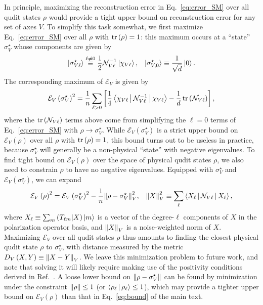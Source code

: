 \documentclass[a4paper,twocolumn,unpublished]{quantumarticle}
\newcommand{\f}[2]{\dfrac{#1}{#2}} %
\newcommand{\p}[1]{\left(#1\right)} %
\renewcommand{\sp}[1]{\left[#1\right]} %
\newcommand{\bk}{\Braket} %
\newcommand{\E}{\mathcal{E}}
\newcommand{\N}{\mathcal{N}}
\def\obk#1{\mathinner{({#1})}}
\begin{document}
In principle, maximizing the reconstruction error in Eq.~\eqref{eq:error_SM} over all qudit states $\rho$ would provide a tight upper bound on reconstruction error for any set of axes $V$.
To simplify this task somewhat, we first maximize Eq.~\eqref{eq:error_SM} over all $\rho$ with $\tr\p\rho=1$: this maximum occurs at a ``state'' $\sigma_V^\star$ whose components are given by
\begin{align}
  \ket{\sigma_{V\ell}^\star} \stackrel{\ell\ne0}{\equiv}
  \f12 \N_{V\ell}^{-1} \ket{\chi_{V\ell}},
  &&
  \ket{\sigma_{V,0}^\star} \equiv \f1{\sqrt{d}} \ket{0}.
\end{align}
The corresponding maximum of $\E_V$ is given by
\begin{align}
  \E_V\p{\sigma_V^\star}^2 = \f1n \sum_{\ell>0}
  \sp{\f14 \bk{\chi_{V\ell}|\N_{V\ell}^{-1}|\chi_{V\ell}}
  - \f1d \tr\p{\N_{V\ell}}},
\end{align}
where the $\tr\p{\N_{V\ell}}$ terms above come from simplifying the $\ell=0$ terms of Eq.~\eqref{eq:error_SM} with $\rho\to\sigma_V^\star$.
While $\E_V\p{\sigma_V^\star}$ is a strict upper bound on $\E_V\p{\rho}$ over all $\rho$ with $\tr\p{\rho}=1$, this bound turns out to be useless in practice, because $\sigma_V^\star$ will generally be a non-physical ``state'' with negative eigenvalues.
To find tight bound on $\E_V\p{\rho}$ over the space of physical qudit states $\rho$, we also need to constrain $\rho$ to have no negative eigenvalues.
Equipped with $\sigma_V^\star$ and $\E_V\p{\sigma_V^\star}$, we can expand
\begin{align}
  \E_V\p{\rho}^2 = \E_V\p{\sigma_V^\star}^2
  - \f1n \norm{\rho-\sigma_V^\star}_V^2,
  &&
  \norm{X}_V^2 \equiv \sum_\ell \bk{X_\ell|\N_{V\ell}|X_\ell},
\end{align}
where $X_\ell\equiv\sum_m\obk{T_{\ell m}|X}\ket{m}$ is a vector of the degree-$\ell$ components of $X$ in the polarization operator basis, and $\norm{X}_V$ is a noise-weighted norm of $X$.
Maximizing $\E_V$ over all qudit states $\rho$ thus amounts to finding the closest physical qudit state $\rho$ to $\sigma_V^\star$, with distance measured by the metric $D_V\p{X,Y}\equiv\norm{X-Y}_V$.
We leave this minimization problem to future work, and note that solving it will likely require making use of the positivity conditions derived in Ref.~\cite{kryszewski2006positivity}.
A loose lower bound on $\norm{\rho-\sigma_V^\star}$ can be found by minimization under the constraint $\norm{\rho}\le1$ (or $\bk{\rho_\ell|\rho_\ell}\le1$), which may provide a tighter upper bound on $\E_V\p{\rho}$ than that in Eq.~\eqref{eq:bound} of the main text.
\end{document}
